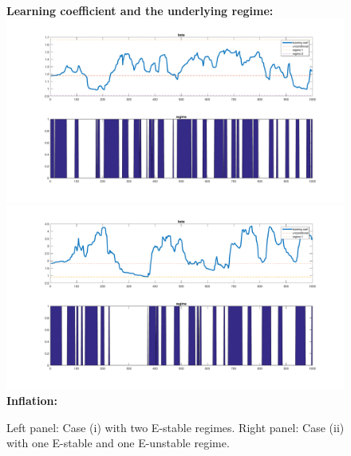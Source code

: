 \documentclass[12pt,reqno]{article}
\numberwithin{equation}{section}
\begin{document}
\begin{figure}[H]
\caption{Left panel: Case (i) with two E-stable regimes. Right panel: Case (ii) with one E-stable and one E-unstable regime. }

\textbf{Learning coefficient and the underlying regime: } \\

\includegraphics[scale=0.2]{fisher_simulation1_learningCoef.pdf} 
\includegraphics[scale=0.2]{fisher_simulation2_learningCoef.pdf} \\


\textbf{Inflation:} \\


\end{figure}
\end{document}

